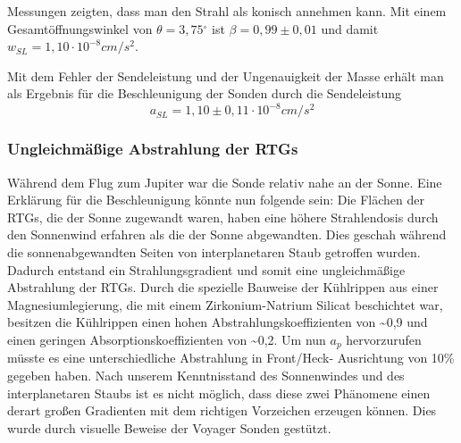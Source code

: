 Messungen \cite{Anderson2002} zeigten, dass man den Strahl als konisch annehmen kann.
Mit einem Gesamt\"offnungswinkel von  $\theta =3,75{}^{\circ}$ ist 
$\beta =0,99\pm 0,01$ und damit  $w_{\mathit{SL}}=1,10\cdot
10^{-8}\mathit{cm}/s^{2}$.

Mit dem Fehler der Sendeleistung und der Ungenauigkeit der Masse
erh\"alt man als Ergebnis f\"ur die Beschleunigung der Sonden durch die
Sendeleistung
\begin{equation}
a_{\mathit{SL}}=1,10\pm 0,11\cdot 10^{-8}\mathit{cm}/s^{2}
\end{equation}


\bigskip

\subsubsection{Ungleichm\"a{\ss}ige Abstrahlung der RTGs}

W\"ahrend dem Flug zum Jupiter war die Sonde relativ nahe an der Sonne.
Eine Erkl\"arung f\"ur die Beschleunigung k\"onnte nun folgende sein:
Die Fl\"achen der RTGs, die der Sonne zugewandt waren, haben eine
h\"ohere Strahlendosis durch den Sonnenwind erfahren als die der Sonne
abgewandten. Dies geschah w\"ahrend die sonnenabgewandten Seiten von
interplanetaren Staub getroffen wurden. Dadurch entstand ein
Strahlungsgradient und somit eine ungleichm\"a{\ss}ige Abstrahlung der
RTGs. Durch die spezielle Bauweise der K\"uhlrippen aus einer
Magnesiumlegierung, die mit einem Zirkonium-Natrium Silicat beschichtet
war, besitzen die K\"uhlrippen einen hohen Abstrahlungskoeffizienten
von \~{}0,9 und einen geringen Absorptionskoeffizienten von \~{}0,2. Um
nun  $a_{p}$ hervorzurufen m\"usste es eine unterschiedliche
Abstrahlung in Front/Heck- Ausrichtung von 10\% gegeben haben. Nach
unserem Kenntnisstand des Sonnenwindes und des interplanetaren Staubs
ist es nicht m\"oglich, dass diese zwei Ph\"anomene einen derart
gro{\ss}en Gradienten mit dem richtigen Vorzeichen erzeugen k\"onnen.
Dies wurde durch visuelle Beweise der Voyager Sonden gest\"utzt\cite{Anderson2002}.

